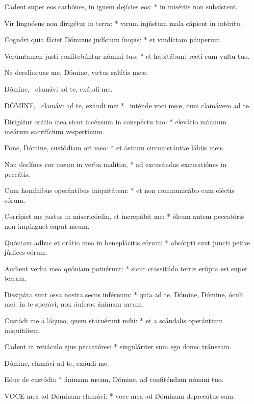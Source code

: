 Cadent super eos carbónes, in ignem dejícies eos: * in misériis non subsístent.

Vir linguósus non dirigétur in terra: * virum injústum mala cápient in intéritu.

Cognóvi quia fáciet Dóminus judícium ínopis: * et vindíctam páuperum.

Verúmtamen justi confitebúntur nómini tuo: * et habitábunt recti cum vultu tuo.

 Ne derelínquas me, Dómine, virtus salútis meæ.

 Dómine, \dag\ clamávi ad te, exáudi me. \ddag


\lettrine[lines=2]{D}{ÓMINE}, \dag\ clamávi ad te, exáudi me: * \ddag\ inténde voci meæ, cum clamávero ad te.

Dirigátur orátio mea sicut incénsum in conspéctu tuo: * elevátio mánuum meárum sacrifícium vespertínum.

Pone, Dómine, custódiam ori meo: * et óstium circumstántiæ lábiis meis.

Non declínes cor meum in verba malítiæ, * ad excusándas excusatiónes in peccátis.

Cum homínibus operántibus iniquitátem: * et non communicábo cum eléctis eórum.

Corrípiet me justus in misericórdia, et increpábit me: * óleum autem peccatóris non impínguet caput meum.

Quóniam adhuc et orátio mea in beneplácitis eórum: * absórpti sunt juncti petræ júdices eórum.

Audient verba mea quóniam potuérunt: * sicut crassitúdo terræ erúpta est super terram.

Dissipáta sunt ossa nostra secus inférnum: * quia ad te, Dómine, Dómine, óculi mei: in te sperávi, non áuferas ánimam meam.

Custódi me a láqueo, quem statuérunt mihi: * et a scándalis operántium iniquitátem.

Cadent in retiáculo ejus peccatóres: * singuláriter sum ego donec tránseam.

 Dómine, clamávi ad te, exáudi me.

 Educ de custódia * ánimam meam, Dómine, ad confiténdum nómini tuo.


\lettrine[lines=2]{V}{OCE} mea ad Dóminum clamávi: * voce mea ad Dóminum deprecátus sum:

